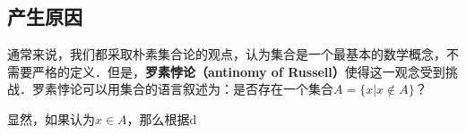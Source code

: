 \begin{issues}
\issueTODO
\end{issues}


\subsection{产生原因}
通常来说，我们都采取朴素集合论的观点，认为集合是一个最基本的数学概念，不需要严格的定义．但是，\textbf{罗素悖论（antinomy of Russell）}使得这一观念受到挑战．罗素悖论可以用集合的语言叙述为：是否存在一个集合$A=\{x|x\notin A\}$？

显然，如果认为$x\in A$，那么根据d